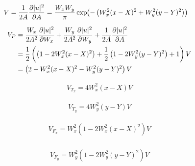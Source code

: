 \begin{equation}
\begin{split}
V = \frac{1}{2A}\pder{|u|^2}{A}  &= \frac{W_x W_y}{\pi} \exp{-\left( W_x^2(x-X)^2 + W_y^2(y-Y)^2 \right)}
\end{split}
\end{equation}

\begin{equation}
\begin{split}
V_{P} &= \frac{W_{x}}{2A^2} \frac{\partial |u|^2}{\partial W_{x}} + \frac{ W_{y}}{2A^2}\frac{\partial |u|^2}{\partial W_{y}} + \frac{1}{2A}\frac{\partial |u|^2}{\partial A} \\
& =  \frac{1}{2}\left(\left(1  - 2 W_{x}^2 (x-X)^2  \right)  +  \frac{1}{2} \left(1  - 2 W_{y}^2 (y-Y)^2  \right)  + 1\right) V \\
& =  \left(2  - W_{x}^2 (x-X)^2  - W_{y}^2 (y-Y)^2  \right) V 
\end{split}
\end{equation}


\begin{equation}
\begin{split}
V_{T_{x}} =  4 W_x^2 (x-X) V
\end{split}
\end{equation}

\begin{equation}
\begin{split}
V_{T_{y}} =  4 W_y^2 (y-Y) V
\end{split}
\end{equation}

\begin{equation}
\begin{split}
V_{F_{x}} = W_{x}^2 \left(1  - 2 W_{x}^2 (x-X)^2  \right) V \\
\end{split}
\end{equation}

\begin{equation}
\begin{split}
V_{F_{y}} = W_{y}^2 \left(1  - 2 W_{y}^2 (y-Y)^2  \right) V \\
\end{split}
\end{equation}





